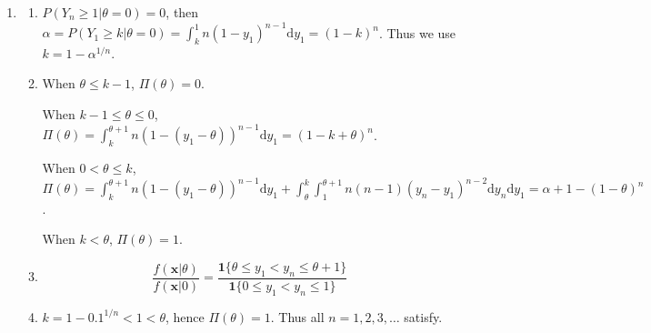 \documentclass{article}
\begin{document}
\begin{enumerate}[leftmargin = 0 em, label = \arabic*., font = \bfseries]
\begin{enumerate}
		\end{enumerate}

		\item 
		\begin{enumerate}
			\item 
			$P(Y_n \geq 1 | \theta = 0) = 0$, then $\alpha = P(Y_1 \geq k | \theta = 0) = \int_{k}^1 n(1 - y_1)^{n-1} \mathrm{d}y_1 = (1 - k)^n$. Thus we use $k = 1 - \alpha^{1/n}$.
			\item 
			When $\theta \leq k-1$, $\Pi(\theta) = 0$.

			When $k-1 \leq \theta \leq 0$, $\Pi(\theta) = \int_{k}^{\theta + 1} n(1 - (y_1 - \theta))^{n-1} \mathrm{d}y_1 = (1 - k + \theta)^n$.

			When $0 < \theta \leq k$, $\Pi(\theta) = \int_{k}^{\theta + 1} n(1 - (y_1 - \theta))^{n-1} \mathrm{d}y_1 + \int_{\theta}^k \int_{1}^{\theta + 1} n(n-1) (y_n - y_1)^{n-2} \mathrm{d}y_n \mathrm{d}y_1 = \alpha + 1 - (1 - \theta)^n$.

			When $k < \theta$, $\Pi(\theta) = 1.$

			\item 
			\[\frac{f(\bm x | \theta)}{f(\bm x | 0)} = \frac{\bm 1 \{ \theta \leq y_1 < y_n \leq \theta + 1\}}{\bm 1\{ 0 \leq y_1 < y_n \leq 1\}}\]

			\item 
			$k = 1 - 0.1^{1/n} < 1 < \theta$, hence $\Pi(\theta) = 1$. Thus all $n = 1,2,3, \ldots$ satisfy. 
		\end{enumerate}
		
	
	

\end{enumerate}
\end{document}
